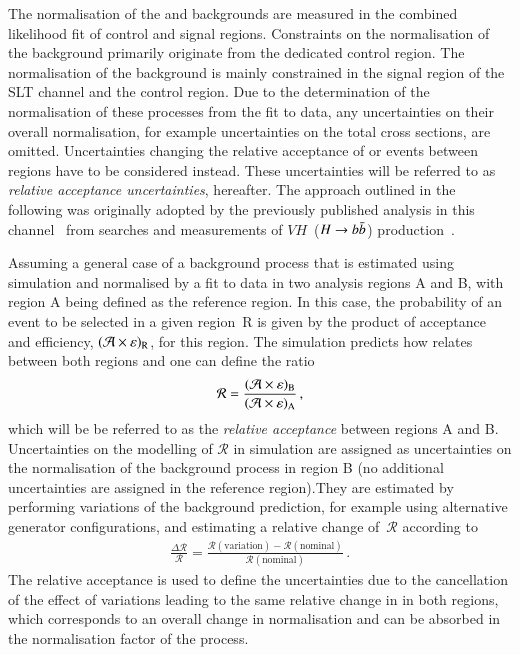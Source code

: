 The normalisation of the \ZHF and \ttbar backgrounds are measured in
the combined likelihood fit of control and signal regions. Constraints
on the normalisation of the \ZHF background primarily originate from
the dedicated control region. The normalisation of the \ttbar
background is mainly constrained in the signal region of the \lephad
SLT channel and the \ZHF control region. Due to the determination of
the normalisation of these processes from the fit to data, any
uncertainties on their overall normalisation, for example
uncertainties on the total cross sections, are omitted. Uncertainties
changing the relative acceptance of \ZHF or \ttbar events between
regions have to be considered instead. These uncertainties will be
referred to as \emph{relative acceptance uncertainties},
hereafter. The approach outlined in the following was originally
adopted by the previously published analysis in this
channel~\cite{HIGG-2016-16-witherratum} from searches and measurements
of $VH$~($H\to b\bar{b}$)
production~\cite{HIGG-2016-29,HIGG-2018-04,HIGG-2018-51}.

Assuming a general case of a background process that is estimated
using simulation and normalised by a fit to data in two analysis
regions A and B, with region A being defined as the reference
region. In this case, the probability of an event to be selected in a
given region~R is given by the product of acceptance and efficiency,
$(\mathcal{A} \times \varepsilon)_{\text{R}}$, for this region. The simulation predicts
how \AccTimesEff relates between both regions and one can define the
ratio
\begin{align*}
  \mathcal{R} = \frac{(\mathcal{A} \times \varepsilon)_{\text{B}}}{(\mathcal{A} \times \varepsilon)_{\text{A}}} \,\text{,}
\end{align*}
which will be be referred to as the \emph{relative acceptance} between
regions A and B. Uncertainties on the modelling of $\mathcal{R}$ in
simulation are assigned as uncertainties on the normalisation of the
background process in region B (no
additional uncertainties are assigned in the reference region).They
are estimated by performing variations of the background prediction,
for example using alternative generator configurations, and estimating
a relative change of~$\mathcal{R}$ according to
\begin{align}
  \frac{\Delta \mathcal{R}}{\mathcal{R}} = \frac{\mathcal{R}(\text{variation}) - \mathcal{R}(\text{nominal})}{\mathcal{R}(\text{nominal})} \,\text{.}
  \label{eq:relative_acceptance_uncertainty}
\end{align}
The relative acceptance is used to define the uncertainties due to the
cancellation of the effect of variations leading to the same relative
change in \AccTimesEff in both regions, which corresponds to an
overall change in normalisation and can be absorbed in the
normalisation factor of the process.

